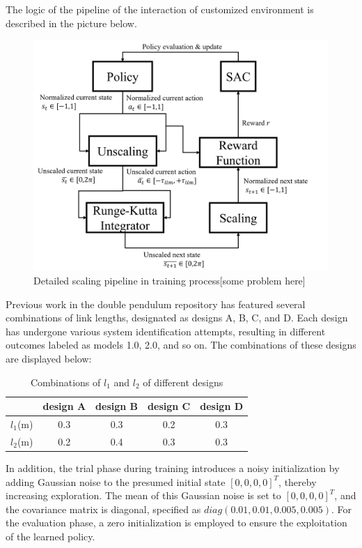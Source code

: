 The logic of the pipeline of the interaction of customized environment is described in the picture below.

\begin{figure}[H]
    \centering
    \includegraphics[width=0.85\linewidth]{figures/simulation_result/scaling_mechanism.png}
    \caption{Detailed scaling pipeline in training process[some problem here]}
    \label{fig:scasling_mech}
\end{figure}

Previous work in the double pendulum repository has featured several combinations of link lengths, designated as designs A, B, C, and D. Each design has undergone various system identification attempts, resulting in different outcomes labeled as models 1.0, 2.0, and so on. The combinations of these designs are displayed below:

\begin{table}[ht]
\centering
\begin{tabular}{|c|c|c|c|c|}
\hline
  & design A & design B & design C & design D \\
\hline
$l_1$(m) & 0.3 & 0.3 & 0.2 & 0.3 \\
\hline
$l_2$(m) & 0.2 & 0.4 & 0.3 & 0.3 \\
\hline
\end{tabular}
\caption{Combinations of $l_1$ and $l_2$ of different designs}
\label{tab:different_designs}
\end{table}

In addition, the trial phase during training introduces a noisy initialization by adding Gaussian noise to the presumed initial state \([0,0,0,0]^T\), thereby increasing exploration. The mean of this Gaussian noise is set to \([0,0,0,0]^T\), and the covariance matrix is diagonal, specified as \(diag(0.01,0.01,0.005,0.005) \). For the evaluation phase, a zero initialization is employed to ensure the exploitation of the learned policy.

